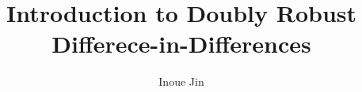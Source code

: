 \documentclass{beamer}
\title{Introduction to Doubly Robust Differece-in-Differences}
\author{Inoue Jin}
\institute{Hitotsubashi University}
\begin{document}
\begin{frame}
    \titlepage
\end{frame}
\end{document}
